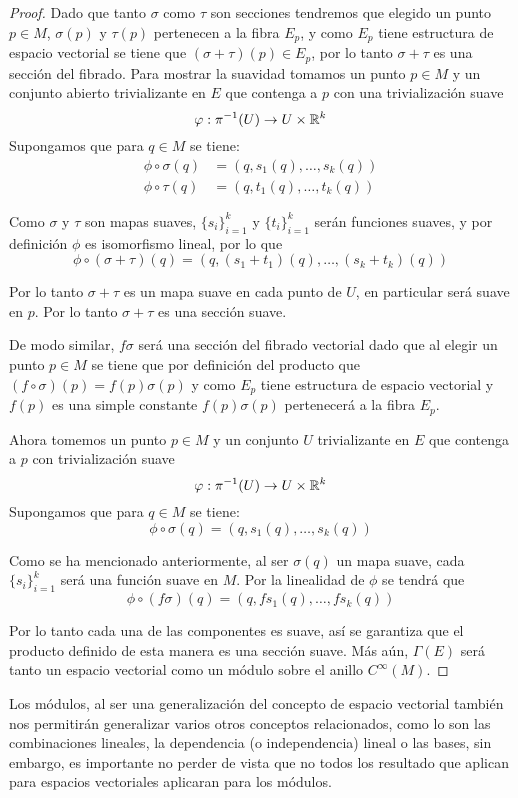 \begin{proof}
	Dado que tanto $\sigma$ como $\tau$ son secciones tendremos que elegido un punto $p \in M$, $\sigma(p)$ y $\tau(p)$ pertenecen a la fibra $E_p$, y como $E_p$ tiene estructura de espacio vectorial se tiene que $(\sigma + \tau)(p) \in E_p$, por lo tanto $\sigma + \tau$ es una sección del fibrado. Para mostrar la suavidad tomamos un punto $p \in M$ y un conjunto abierto trivializante en $E$ que contenga a $p$ con una trivialización suave
	\[
		\varphi: \pi^{-1}(U) \to U \times \mathbb{R}^k
	\]
	Supongamos que para $q \in M$ se tiene:
	\begin{align*}
		\phi \circ \sigma(q) & = (q, s_1(q), \dots, s_k(q)) \\
		\phi \circ \tau(q)   & = (q, t_1(q), \dots, t_k(q))
	\end{align*}

	Como $\sigma$ y $\tau$ son mapas suaves, $\{s_i\}_{i=1}^k$ y  $\{t_i\}_{i=1}^k$ serán funciones suaves, y por definición $\phi$ es isomorfismo lineal, por lo que
	\[
		\phi \circ (\sigma + \tau)(q) = (q, (s_1 + t_1)(q), \dots, (s_k + t_k)(q))
	\]

	Por lo tanto $\sigma + \tau$ es un mapa suave en cada punto de $U$, en particular será suave en $p$. Por lo tanto $\sigma + \tau$ es una sección suave.

	De modo similar, $f\sigma$ será una sección del fibrado vectorial dado que al elegir un punto $p \in M$ se tiene que por definición del producto que $(f \circ \sigma)(p) = f(p)\sigma(p)$ y como $E_p$ tiene estructura de espacio vectorial y $f(p)$ es una simple constante $f(p)\sigma(p)$ pertenecerá a la fibra $E_p$.

	Ahora tomemos un punto $p \in M$ y un conjunto $U$ trivializante en $E$ que contenga a $p$ con trivialización suave
	\[
		\varphi: \pi^{-1}(U) \to U \times \mathbb{R}^{k}
	\]
	Supongamos que para $q \in M$ se tiene:
	\[
		\phi \circ \sigma(q) = (q, s_1(q), \dots, s_k(q))
	\]

	Como se ha mencionado anteriormente, al ser $\sigma(q)$ un mapa suave, cada $\{s_i\}_{i=1}^k$ será una función suave en $M$. Por la linealidad de $\phi$ se tendrá que
	\[
		\phi \circ (f \sigma)(q) = (q, fs_1(q),\dots, fs_k(q))
	\]

	Por lo tanto cada una de las componentes es suave, así se garantiza que el producto definido de esta manera es una sección suave. Más aún, $\Gamma(E)$ será tanto un espacio vectorial como un módulo sobre el anillo $C^{\infty}(M)$.
\end{proof}

Los módulos, al ser una generalización del concepto de espacio vectorial también nos permitirán generalizar varios otros conceptos relacionados, como lo son las combinaciones lineales, la dependencia (o independencia) lineal o las bases, sin embargo, es importante no perder de vista que no todos los resultado que aplican para espacios vectoriales aplicaran para los módulos.
